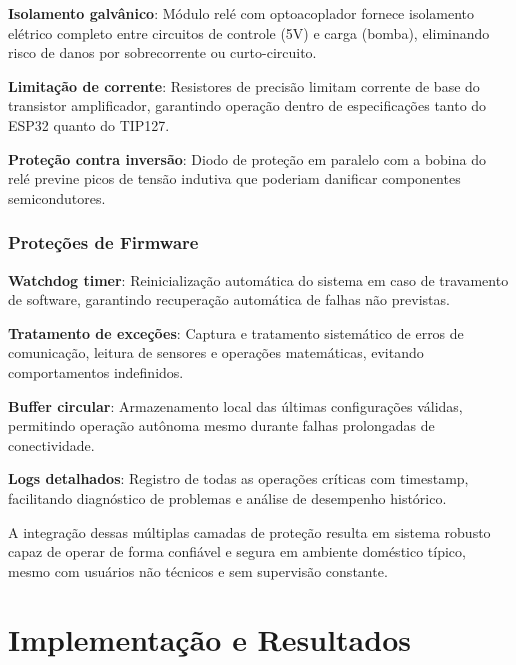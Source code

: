 \documentclass[twoside,english,brazilian]{UNISINOSmonografia}
\begin{document}
\textbf{Isolamento galvânico}: Módulo relé com optoacoplador fornece isolamento elétrico completo entre circuitos de controle (5V) e carga (bomba), eliminando risco de danos por sobrecorrente ou curto-circuito.

\textbf{Limitação de corrente}: Resistores de precisão limitam corrente de base do transistor amplificador, garantindo operação dentro de especificações tanto do ESP32 quanto do TIP127.

\textbf{Proteção contra inversão}: Diodo de proteção em paralelo com a bobina do relé previne picos de tensão indutiva que poderiam danificar componentes semicondutores.

\subsection{Proteções de Firmware}

\textbf{Watchdog timer}: Reinicialização automática do sistema em caso de travamento de software, garantindo recuperação automática de falhas não previstas.

\textbf{Tratamento de exceções}: Captura e tratamento sistemático de erros de comunicação, leitura de sensores e operações matemáticas, evitando comportamentos indefinidos.

\textbf{Buffer circular}: Armazenamento local das últimas configurações válidas, permitindo operação autônoma mesmo durante falhas prolongadas de conectividade.

\textbf{Logs detalhados}: Registro de todas as operações críticas com timestamp, facilitando diagnóstico de problemas e análise de desempenho histórico.

A integração dessas múltiplas camadas de proteção resulta em sistema robusto capaz de operar de forma confiável e segura em ambiente doméstico típico, mesmo com usuários não técnicos e sem supervisão constante.


\chapter{Implementação e Resultados}
\end{document}
